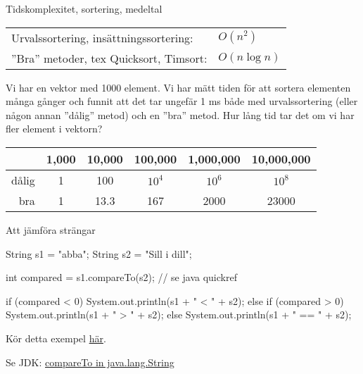 \documentclass{lecturenotes}
\begin{document}
\begin{Slide}{Tidskomplexitet, sortering, medeltal}
\begin{tabular}{ll}
Urvalssortering, insättningssortering: & $O(n^2)$ \\
''Bra'' metoder, tex Quicksort, Timsort:  & $O(n\log n)$
\end{tabular}

\vspace{1em}\footnotesize
Vi har en vektor med 1000 element. Vi har mätt tiden för att sortera elementen många gånger och funnit att det tar ungefär 1 ms både med urvalssortering (eller någon annan ''dålig'' metod) och en ''bra'' metod. Hur lång tid tar det om vi har fler element i vektorn?

\vspace{1em}
\begin{tabular}{rccccc}
       & 1,000 & 10,000 & 100,000 & 1,000,000 & 10,000,000 \\ \hline
dålig  & 1     & 100    & $10^4$  & $10^6$   & $10^8$ \\
bra    & 1     & 13.3   & 167     & 2000     & 23000
\end{tabular}
\end{Slide} 

\begin{Slide}{Att jämföra strängar}
\begin{Code}
        String s1 = "abba";
        String s2 = "Sill i dill";

        int compared = s1.compareTo(s2); // se java quickref

        if (compared < 0) {
            System.out.println(s1 + " < " + s2);
        } else if (compared > 0) {
            System.out.println(s1 + " > " + s2);
        } else {
            System.out.println(s1 + " == " + s2);
        }

\end{Code}
\footnotesize

Kör detta exempel \href{}{här}.

Se JDK: \href{http://docs.oracle.com/javase/8/docs/api/java/lang/String.html#compareTo-java.lang.String-}{compareTo in java.lang.String}
\end{Slide}
\end{document}
